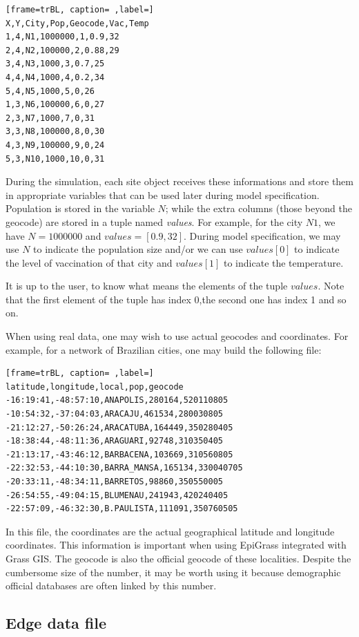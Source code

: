 \begin{lstlisting}[frame=trBL, caption= ,label=]
X,Y,City,Pop,Geocode,Vac,Temp
1,4,N1,1000000,1,0.9,32
2,4,N2,100000,2,0.88,29
3,4,N3,1000,3,0.7,25
4,4,N4,1000,4,0.2,34
5,4,N5,1000,5,0,26
1,3,N6,100000,6,0,27
2,3,N7,1000,7,0,31
3,3,N8,100000,8,0,30
4,3,N9,100000,9,0,24
5,3,N10,1000,10,0,31
\end{lstlisting}

During the simulation, each site object receives these informations and store them in appropriate variables that can be used later during model specification. Population is stored in the variable $N$; while the extra columns (those beyond the geocode) are stored in a tuple named \textit{values}. For example, for the city $N1$, we have $N = 1000000$ and $values=[0.9,32]$. During model specification, we may use $N$ to indicate the population size and/or we can use $values[0]$ to indicate the level of vaccination of that city and $values[1]$ to indicate the temperature. 

It is up to the user, to know what means the elements of the tuple $values$. Note that the first element of the tuple has index 0,the second one has index 1 and so on.

When using real data, one may wish to use actual geocodes and coordinates. For example, for a network of Brazilian cities, one may build the following file:


\begin{lstlisting}[frame=trBL, caption= ,label=]
latitude,longitude,local,pop,geocode
-16:19:41,-48:57:10,ANAPOLIS,280164,520110805
-10:54:32,-37:04:03,ARACAJU,461534,280030805
-21:12:27,-50:26:24,ARACATUBA,164449,350280405
-18:38:44,-48:11:36,ARAGUARI,92748,310350405
-21:13:17,-43:46:12,BARBACENA,103669,310560805
-22:32:53,-44:10:30,BARRA_MANSA,165134,330040705
-20:33:11,-48:34:11,BARRETOS,98860,350550005
-26:54:55,-49:04:15,BLUMENAU,241943,420240405
-22:57:09,-46:32:30,B.PAULISTA,111091,350760505
\end{lstlisting}



In this file, the coordinates are the actual geographical latitude and longitude coordinates. This information is important when using EpiGrass integrated with Grass GIS. The geocode is also the official geocode of these localities. Despite the cumbersome size of the number, it may be worth using it because demographic official databases are often linked by this number.



\subsection{Edge data file}

